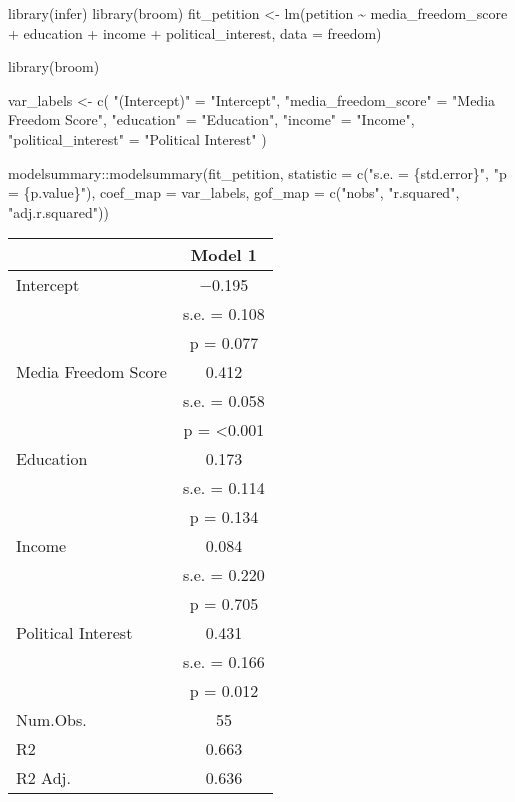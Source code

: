 \documentclass[
]{article}
\newenvironment{Shaded}{\begin{snugshade}}{\end{snugshade}}
\newcommand{\AttributeTok}[1]{\textcolor[rgb]{0.77,0.63,0.00}{#1}}
\newcommand{\FunctionTok}[1]{\textcolor[rgb]{0.00,0.00,0.00}{#1}}
\newcommand{\NormalTok}[1]{#1}
\newcommand{\OtherTok}[1]{\textcolor[rgb]{0.56,0.35,0.01}{#1}}
\newcommand{\SpecialCharTok}[1]{\textcolor[rgb]{0.00,0.00,0.00}{#1}}
\newcommand{\StringTok}[1]{\textcolor[rgb]{0.31,0.60,0.02}{#1}}
\begin{document}
\begin{Shaded}
\begin{Highlighting}[]
\FunctionTok{library}\NormalTok{(infer)}
\FunctionTok{library}\NormalTok{(broom)}
\NormalTok{fit\_petition }\OtherTok{\textless{}{-}} \FunctionTok{lm}\NormalTok{(petition }\SpecialCharTok{\textasciitilde{}}\NormalTok{ media\_freedom\_score }\SpecialCharTok{+}\NormalTok{ education }\SpecialCharTok{+}\NormalTok{ income }\SpecialCharTok{+}\NormalTok{ political\_interest, }\AttributeTok{data =}\NormalTok{ freedom)}

\FunctionTok{library}\NormalTok{(broom)}

\NormalTok{var\_labels }\OtherTok{\textless{}{-}} \FunctionTok{c}\NormalTok{(}
    \StringTok{"(Intercept)"} \OtherTok{=} \StringTok{"Intercept"}\NormalTok{,}
    \StringTok{"media\_freedom\_score"} \OtherTok{=} \StringTok{"Media Freedom Score"}\NormalTok{,}
    \StringTok{"education"} \OtherTok{=} \StringTok{"Education"}\NormalTok{,}
    \StringTok{"income"} \OtherTok{=} \StringTok{"Income"}\NormalTok{,}
    \StringTok{"political\_interest"} \OtherTok{=} \StringTok{"Political Interest"}
\NormalTok{)}

\NormalTok{modelsummary}\SpecialCharTok{::}\FunctionTok{modelsummary}\NormalTok{(fit\_petition,}
                             \AttributeTok{statistic =} \FunctionTok{c}\NormalTok{(}\StringTok{"s.e. = \{std.error\}"}\NormalTok{,}
               \StringTok{"p = \{p.value\}"}\NormalTok{),}
\AttributeTok{coef\_map =}\NormalTok{ var\_labels,}
\AttributeTok{gof\_map =} \FunctionTok{c}\NormalTok{(}\StringTok{"nobs"}\NormalTok{, }\StringTok{"r.squared"}\NormalTok{, }\StringTok{"adj.r.squared"}\NormalTok{))}
\end{Highlighting}
\end{Shaded}

\begin{table}
\centering
\begin{tabular}[t]{lc}
\toprule
  & Model 1\\
\midrule
Intercept & \num{-0.195}\\
 & s.e. = \num{0.108}\\
 & p = \num{0.077}\\
Media Freedom Score & \num{0.412}\\
 & s.e. = \num{0.058}\\
 & p = \num{<0.001}\\
Education & \num{0.173}\\
 & s.e. = \num{0.114}\\
 & p = \num{0.134}\\
Income & \num{0.084}\\
 & s.e. = \num{0.220}\\
 & p = \num{0.705}\\
Political Interest & \num{0.431}\\
 & s.e. = \num{0.166}\\
 & p = \num{0.012}\\
\midrule
Num.Obs. & \num{55}\\
R2 & \num{0.663}\\
R2 Adj. & \num{0.636}\\
\bottomrule
\end{tabular}
\end{table}
\end{document}

